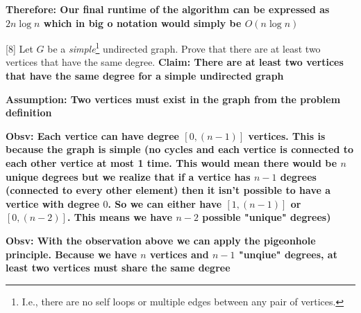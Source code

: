 \documentclass[addpoints]{exam}
\begin{document}
\begin{questions}
\textbf{Therefore: Our final runtime of the algorithm can be expressed as $2n\log{n}$ which in big o notation would simply be $O(n\log{n})$}

[8]
Let $G$ be a {\em simple}\footnote{I.e., there are no self loops or multiple edges between any pair of vertices.} undirected graph. Prove that there are at least two vertices that have the same degree. 
\textbf{Claim: There are at least two vertices that have the same degree for a simple undirected graph}

\textbf{Assumption: Two vertices must exist in the graph from the problem definition}

\textbf{Obsv: Each vertice can have degree $[0, (n-1)]$ vertices. This is because the graph is simple (no cycles and each vertice is connected to each other vertice at most 1 time. This would mean there would be $n$ unique degrees but we realize that if a vertice has $n-1$ degrees (connected to every other element) then it isn't possible to have a vertice with degree $0$. So we can either have $[1, (n-1)]$ or $[0, (n-2)]$. This means we have $n-2$ possible "unique" degrees)}

\textbf{Obsv: With the observation above we can apply the pigeonhole principle. Because we have $n$ vertices and $n-1$ "unqiue" degrees, at least two vertices must share the same degree}


\end{questions}
\end{document}
